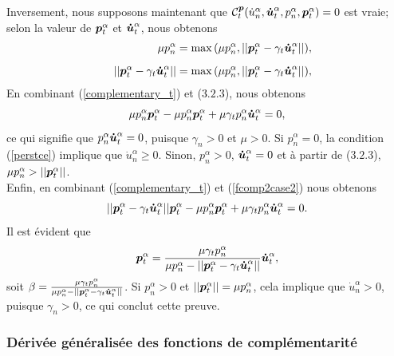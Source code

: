\begin{pruf}
\noindent Inversement, nous supposons maintenant que ${\cal C}_{t}^{\boldsymbol{p}}(\dot{u}^{\alpha}_n,\boldsymbol{\dot{u}}^{\alpha}_t,p^{\alpha}_n,\boldsymbol{p}^{\alpha}_t)=0$ est vraie; selon la valeur de $\boldsymbol{p}^{\alpha}_t$ et $\boldsymbol{\dot{u}}^{\alpha}_t$, nous obtenons
\begin{eqnarray}
&&\mu p^{\alpha}_n = \max{(\mu p^{\alpha}_n, ||\boldsymbol{p}^{\alpha}_t - \gamma_t \boldsymbol{\dot{u}}^{\alpha}_t||)},\\[2mm]\label{fcomp2case1}
&&||\boldsymbol{p}^{\alpha}_t - \gamma_t \boldsymbol{\dot{u}}^{\alpha}_t|| = \max{(\mu p^{\alpha}_n, ||\boldsymbol{p}^{\alpha}_t - \gamma_t \boldsymbol{\dot{u}}^{\alpha}_t||)},\label{fcomp2case2}
\end{eqnarray}
\noindent En combinant (\ref{complementary_t}) et ($3.2.3$), nous obtenons
\begin{equation*}
\mu p^{\alpha}_n \boldsymbol{p}^{\alpha}_t - \mu p^{\alpha}_n \boldsymbol{p}^{\alpha}_t + \mu \gamma_t p^{\alpha}_n \boldsymbol{\dot{u}}^{\alpha}_t = 0,
\end{equation*}
\noindent ce qui signifie que $p^{\alpha}_n \boldsymbol{\dot{u}}^{\alpha}_t = 0$, puisque $\gamma_n>0$ et $\mu > 0$. Si $p^{\alpha}_n = 0$, la condition (\ref{perstce}) implique que $\dot{u}^{\alpha}_n \geq 0$. Sinon, $p^{\alpha}_n > 0$, $\boldsymbol{\dot{u}}^{\alpha}_t = 0$ et à partir de ($3.2.3$), $\mu p^{\alpha}_n > ||\boldsymbol{p}^{\alpha}_t||$.\\
\noindent Enfin, en combinant (\ref{complementary_t}) et (\ref{fcomp2case2}) nous obtenons
\begin{equation*}
||\boldsymbol{p}^{\alpha}_t - \gamma_t \boldsymbol{\dot{u}}^{\alpha}_t|| \boldsymbol{p}^{\alpha}_t - \mu p^{\alpha}_n \boldsymbol{p}^{\alpha}_t + \mu \gamma_t p^{\alpha}_n \boldsymbol{\dot{u}}^{\alpha}_t = 0.
\end{equation*}
\noindent Il est évident que
\begin{equation*}
\boldsymbol{p}^{\alpha}_t = \frac{\mu \gamma_t p^{\alpha}_n}{\mu p^{\alpha}_n - ||\boldsymbol{p}^{\alpha}_t - \gamma_t \boldsymbol{\dot{u}}^{\alpha}_t||} \boldsymbol{\dot{u}}^{\alpha}_t,
\end{equation*}
\noindent soit $\beta = \frac{\mu \gamma_t p^{\alpha}_n}{\mu p^{\alpha}_n - ||\boldsymbol{p}^{\alpha}_t - \gamma_t \boldsymbol{\dot{u}}^{\alpha}_t||}$. Si $p^{\alpha}_n > 0$ et $||\boldsymbol{p}^{\alpha}_t|| = \mu p^{\alpha}_n$,  cela implique que $\dot{u}^{\alpha}_n > 0$, puisque $\gamma_n>0$, ce qui conclut cette preuve.
\end{pruf}

\subsubsection{Dérivée généralisée des fonctions de complémentarité}\label{general_deriv}

